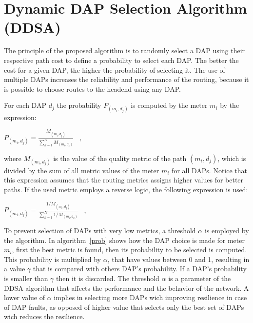 \documentclass[conference]{IEEEtran}
\begin{document}
\section{Dynamic DAP Selection Algorithm (DDSA)}


The principle of the proposed algorithm is to randomly select a DAP using their respective path cost to define a probability to select each DAP. The better the cost for a given DAP, the higher the probability of selecting it. The use of multiple DAPs increases the reliability and performance of the routing, because it is possible to choose routes to the headend using any DAP.

For each DAP $d_{j}$ the probability $P_{(m_{i},d_{j})}$ is computed by the meter $m_{i}$ by the expression: \begin{center}$ P_{(m_{i},d_{j})} =  \frac {M_{(m_{i},d_{j})}}{\sum\limits_{k=1}^{N} M_{(m_{i},d_{k})}} $  \  , \end{center} where $ {M_{(m_{i},d_{j})}} $ is the value of the quality metric of the path $(m_{i},d_{j})$, which is divided by the sum of all metric values ​​of the meter $ m_ {i} $ for all DAPs.  Notice that this expression assumes that the routing metrics assigns higher values for better paths. If the used metric employs a reverse logic, the following expression is used: \begin{center}$ P_{(m_{i},d_{j})} =  \frac {1/M_{(m_{i},d_{j})}}{\sum\limits_{k=1}^{N} 1/M_{(m_{i},d_{k})}} $  \  , \end{center}

To prevent selection of DAPs with very low metrics, a threshold $\alpha$ is employed by the algorithm. In algorithm~\ref{prob} shows how the DAP choice is made for meter $m_{i}$, first the best metric is found, then its probability to be selected is computed. This probability is multiplied by $\alpha$, that have values between 0 and 1, resulting in a value $\gamma$ that is compared with others DAP's probability. If a DAP's probability is smaller than  $\gamma$ then it is discarded. The threshold $\alpha$ is a parameter of the DDSA algorithm  that affects the performance and the behavior of the network. A lower value of $\alpha$ implies in selecting more DAPs wich improving resilience in case of DAP faults, as opposed of higher value that selects only the best set of DAPs wich reduces the resilience.
\end{document}
